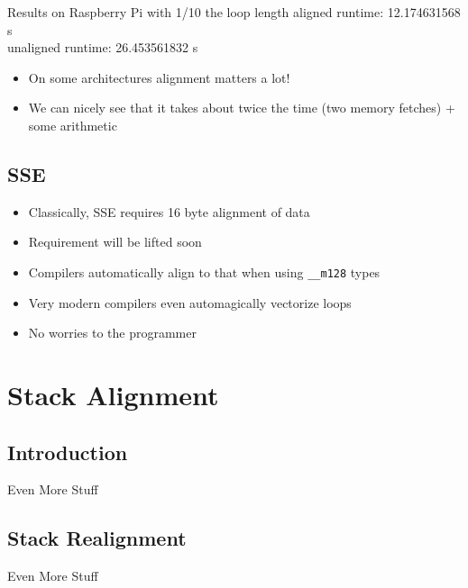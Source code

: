 \documentclass{beamer}
\begin{document}
\begin{frame}{\insertsection}{\insertsubsection}
    \begin{block}{Results on Raspberry Pi with 1/10 the loop length}
        aligned runtime: 12.174631568 s\\
        unaligned runtime: 26.453561832 s
    \end{block}
    \begin{itemize}
        \item On some architectures alignment matters a lot!
        \item We can nicely see that it takes about twice the time (two memory fetches) + some
            arithmetic
	\end{itemize}
\end{frame}

\subsection{SSE}
\begin{frame}[fragile]{\insertsection}{\insertsubsection}
    \begin{itemize}
        \item Classically, SSE requires 16 byte alignment of data
        \item Requirement will be lifted soon
        \item Compilers automatically align to that when using \verb|__m128| types
        \item Very modern compilers even automagically vectorize loops
        \item No worries to the programmer {\large\smiley}
    \end{itemize}
\end{frame}

\section{Stack Alignment}
\subsection{Introduction}
\begin{frame}{\insertsection}{\insertsubsection}
	Even More Stuff
\end{frame}

\subsection{Stack Realignment}
\begin{frame}{\insertsection}{\insertsubsection}
	Even More Stuff
\end{frame}
\end{document}
